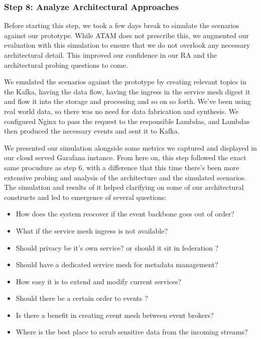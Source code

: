\documentclass{bmcart}
\begin{document}
\subsubsection{Step 8: Analyze Architectural Approaches}

Before starting this step, we took a few days break to simulate the scenarios against our prototype. While ATAM does not prescribe this, we augmented our evaluation with this simulation to ensure that we do not overlook any necessary architectural detail. This improved our confidence in our RA and the architectural probing questions to come. 

We emulated the scenarios against the prototype by creating relevant topics in the Kafka, having the data flow, having the ingress in the service mesh digest it and flow it into the storage and processing and so on so forth. We've been using real world data, so there was no need for data fabrication and synthesis. We configured Nginx to pass the request to the responsible Lambdas, and Lambdas then produced the necessary events and sent it to Kafka. 

We presented our simulation alongside some metrics we captured and displayed in our cloud served Garafana instance. From here on, this step followed the exact same procudure as step 6, with a difference that this time there's been more extensive probing and analysis of the architecture and the simulated scenarios. The simulation and results of it helped clarifying on some of our architectural constructs and led to emergence of several questions: 

\begin{itemize}
    \item How does the system reocover if the event backbone goes out of order?
    \item What if the service mesh ingress is not available?
    \item Should privacy be it's own service? or should it sit in federation ?
    \item Should have a dedicated service mesh for metadata management?
    \item How easy it is to extend and modify current services?
    \item Should there be a certain order to events ?
    \item Is there a benefit in creating event mesh between event brokers?
    \item Where is the best place to scrub sensitive data from the incoming streams?
\end{itemize}
\end{document}
